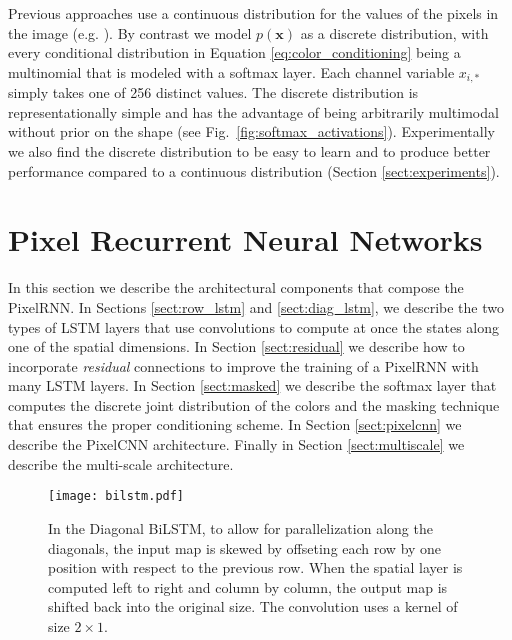 \documentclass{article}
\renewcommand{\vec}{\mathbf}
\begin{document}
Previous approaches use a continuous distribution for the values of the pixels in the image (e.g. \citet{theis2015generative, uria2013deep}). By contrast we model $p(\vec{x})$ as a discrete distribution, with every conditional distribution in Equation \ref{eq:color_conditioning} being a multinomial that is modeled with a softmax layer. Each channel variable $x_{i,*}$ simply takes one of 256 distinct values. The discrete distribution is representationally simple and has the advantage of being arbitrarily multimodal without prior on the shape (see Fig.~\ref{fig:softmax_activations}). Experimentally we also find the discrete distribution to be easy to learn and to produce better performance compared to a continuous distribution (Section \ref{sect:experiments}). 














 \section{Pixel Recurrent Neural Networks}
\label{sect:pixelrnn}

In this section we describe the architectural components that compose the {PixelRNN}. In Sections \ref{sect:row_lstm} and \ref{sect:diag_lstm}, we describe the two types of LSTM layers that use convolutions to compute at once the states along one of the spatial dimensions. 
In Section \ref{sect:residual} we describe how to incorporate \emph{residual} connections to improve the training of a PixelRNN with many LSTM layers.  In Section \ref{sect:masked} we describe the softmax layer that computes the {discrete} joint distribution of the colors and the masking technique that ensures the proper conditioning scheme. In Section \ref{sect:pixelcnn} we describe the PixelCNN architecture. Finally in Section \ref{sect:multiscale} we describe the multi-scale architecture.

\begin{figure}
\centering
\texttt{[image: bilstm.pdf]}
\vspace{-0.3cm}
\caption{In the Diagonal BiLSTM, to allow for parallelization along the diagonals, the input map is skewed by offseting each row by one position with respect to the previous row. When the spatial layer is computed left to right and column by column, the output map is shifted back into the original size. The convolution uses a kernel of size $2 \times 1$. }
\label{fig:bilstm}
\vspace{-0.3cm}
\end{figure}
\end{document}
